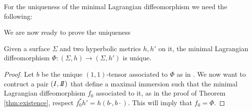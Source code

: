 For the uniqueness of the minimal Lagrangian diffeomorphism we need the following:

We are now ready to prove the uniqueness
\begin{theorem}
    Given a surface $\Sigma$ and two hyperbolic metrics $h, h'$ on it, the minimal Lagrangian diffeomorphism $\Phi : (\Sigma, h) \to (\Sigma, h')$ is unique.
\end{theorem}
\begin{proof}
    Let $b$ be the unique $(1,1)$-tensor associated to $\Phi$ as in . We now want to contruct a pair $(\I,\II)$ that define a maximal immersion such that the minimal Lagrangian diffeomorphism $f_0$ associated to it, as in the proof of Theorem \ref{thm:existence}, respect $f_0^* h' = h(b \cdot, b \cdot)$. This will imply that $f_0 = \Phi$.
\end{proof}

